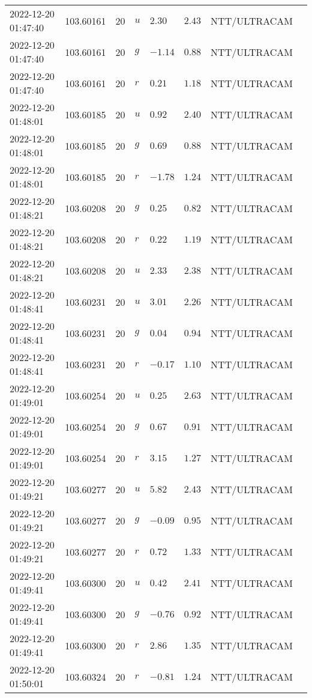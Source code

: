 \documentclass{nature_plusfigure}
\begin{document}
\begin{supplement}
\begin{center}
\begin{longtable}{llllllll}
2022-12-20 01:47:40 & 103.60161 & 20 & $u$ & $2.30$ & $2.43$ & NTT/ULTRACAM &  \\ 
2022-12-20 01:47:40 & 103.60161 & 20 & $g$ & $-1.14$ & $0.88$ & NTT/ULTRACAM &  \\ 
2022-12-20 01:47:40 & 103.60161 & 20 & $r$ & $0.21$ & $1.18$ & NTT/ULTRACAM &  \\ 
2022-12-20 01:48:01 & 103.60185 & 20 & $u$ & $0.92$ & $2.40$ & NTT/ULTRACAM &  \\ 
2022-12-20 01:48:01 & 103.60185 & 20 & $g$ & $0.69$ & $0.88$ & NTT/ULTRACAM &  \\ 
2022-12-20 01:48:01 & 103.60185 & 20 & $r$ & $-1.78$ & $1.24$ & NTT/ULTRACAM &  \\ 
2022-12-20 01:48:21 & 103.60208 & 20 & $g$ & $0.25$ & $0.82$ & NTT/ULTRACAM &  \\ 
2022-12-20 01:48:21 & 103.60208 & 20 & $r$ & $0.22$ & $1.19$ & NTT/ULTRACAM &  \\ 
2022-12-20 01:48:21 & 103.60208 & 20 & $u$ & $2.33$ & $2.38$ & NTT/ULTRACAM &  \\ 
2022-12-20 01:48:41 & 103.60231 & 20 & $u$ & $3.01$ & $2.26$ & NTT/ULTRACAM &  \\ 
2022-12-20 01:48:41 & 103.60231 & 20 & $g$ & $0.04$ & $0.94$ & NTT/ULTRACAM &  \\ 
2022-12-20 01:48:41 & 103.60231 & 20 & $r$ & $-0.17$ & $1.10$ & NTT/ULTRACAM &  \\ 
2022-12-20 01:49:01 & 103.60254 & 20 & $u$ & $0.25$ & $2.63$ & NTT/ULTRACAM &  \\ 
2022-12-20 01:49:01 & 103.60254 & 20 & $g$ & $0.67$ & $0.91$ & NTT/ULTRACAM &  \\ 
2022-12-20 01:49:01 & 103.60254 & 20 & $r$ & $3.15$ & $1.27$ & NTT/ULTRACAM &  \\ 
2022-12-20 01:49:21 & 103.60277 & 20 & $u$ & $5.82$ & $2.43$ & NTT/ULTRACAM &  \\ 
2022-12-20 01:49:21 & 103.60277 & 20 & $g$ & $-0.09$ & $0.95$ & NTT/ULTRACAM &  \\ 
2022-12-20 01:49:21 & 103.60277 & 20 & $r$ & $0.72$ & $1.33$ & NTT/ULTRACAM &  \\ 
2022-12-20 01:49:41 & 103.60300 & 20 & $u$ & $0.42$ & $2.41$ & NTT/ULTRACAM &  \\ 
2022-12-20 01:49:41 & 103.60300 & 20 & $g$ & $-0.76$ & $0.92$ & NTT/ULTRACAM &  \\ 
2022-12-20 01:49:41 & 103.60300 & 20 & $r$ & $2.86$ & $1.35$ & NTT/ULTRACAM &  \\ 
2022-12-20 01:50:01 & 103.60324 & 20 & $r$ & $-0.81$ & $1.24$ & NTT/ULTRACAM &  \\ 

\end{longtable}
\end{center}
\end{supplement}
\end{document}

